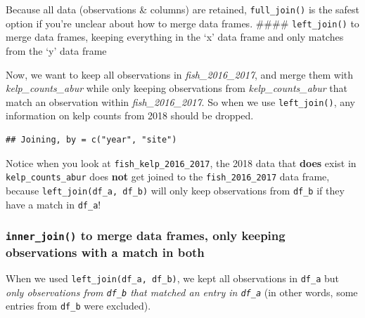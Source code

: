 \documentclass[]{book}
\newenvironment{Shaded}{\begin{snugshade}}{\end{snugshade}}
\newcommand{\DecValTok}[1]{\textcolor[rgb]{0.00,0.00,0.81}{#1}}
\newcommand{\KeywordTok}[1]{\textcolor[rgb]{0.13,0.29,0.53}{\textbf{#1}}}
\newcommand{\NormalTok}[1]{#1}
\newcommand{\OperatorTok}[1]{\textcolor[rgb]{0.81,0.36,0.00}{\textbf{#1}}}
\newcommand{\StringTok}[1]{\textcolor[rgb]{0.31,0.60,0.02}{#1}}
\begin{document}
Because all data (observations \& columns) are retained, \texttt{full\_join()} is the safest option if you're unclear about how to merge data frames.
\#\#\#\# \texttt{left\_join()} to merge data frames, keeping everything in the `x' data frame and only matches from the `y' data frame

Now, we want to keep all observations in \emph{fish\_2016\_2017}, and merge them with \emph{kelp\_counts\_abur} while only keeping observations from \emph{kelp\_counts\_abur} that match an observation within \emph{fish\_2016\_2017}. So when we use \texttt{left\_join()}, any information on kelp counts from 2018 should be dropped.

\begin{Shaded}
\end{Shaded}

\begin{verbatim}
## Joining, by = c("year", "site")
\end{verbatim}

Notice when you look at \texttt{fish\_kelp\_2016\_2017}, the 2018 data that \textbf{does} exist in \texttt{kelp\_counts\_abur} does \textbf{not} get joined to the \texttt{fish\_2016\_2017} data frame, because \texttt{left\_join(df\_a,\ df\_b)} will only keep observations from \texttt{df\_b} if they have a match in \texttt{df\_a}!

\hypertarget{inner_join-to-merge-data-frames-only-keeping-observations-with-a-match-in-both}{%
\subsubsection{\texorpdfstring{\texttt{inner\_join()} to merge data frames, only keeping observations with a match in \textbf{both}}{inner\_join() to merge data frames, only keeping observations with a match in both}}\label{inner_join-to-merge-data-frames-only-keeping-observations-with-a-match-in-both}}

When we used \texttt{left\_join(df\_a,\ df\_b)}, we kept all observations in \texttt{df\_a} but \emph{only observations from \texttt{df\_b} that matched an entry in \texttt{df\_a}} (in other words, some entries from \texttt{df\_b} were excluded).
\end{document}
